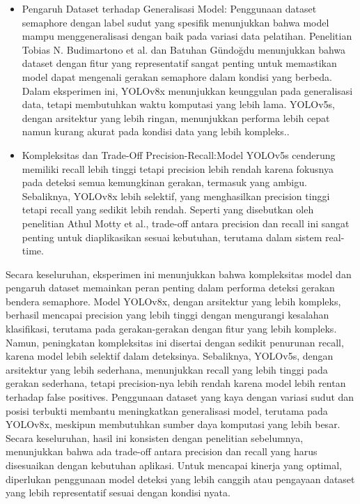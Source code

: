 \documentclass[12pt,a4paper]{article}
\begin{document}
\begin{adjustwidth}{3em}{0pt}
\begin{itemize}
    \item Pengaruh Dataset terhadap Generalisasi Model: Penggunaan dataset semaphore dengan label sudut yang spesifik menunjukkan bahwa model mampu menggeneralisasi dengan baik pada variasi data pelatihan. Penelitian Tobias N. Budimartono et al. dan Batuhan Gündoğdu menunjukkan bahwa dataset dengan fitur yang representatif sangat penting untuk memastikan model dapat mengenali gerakan semaphore dalam kondisi yang berbeda. Dalam eksperimen ini, YOLOv8x menunjukkan keunggulan pada generalisasi data, tetapi membutuhkan waktu komputasi yang lebih lama. YOLOv5s, dengan arsitektur yang lebih ringan, menunjukkan performa lebih cepat namun kurang akurat pada kondisi data yang lebih kompleks..

    \item Kompleksitas dan Trade-Off Precision-Recall:Model YOLOv5s cenderung memiliki recall lebih tinggi tetapi precision lebih rendah karena fokusnya pada deteksi semua kemungkinan gerakan, termasuk yang ambigu. Sebaliknya, YOLOv8x lebih selektif, yang menghasilkan precision tinggi tetapi recall yang sedikit lebih rendah. Seperti yang disebutkan oleh penelitian Athul Motty et al., trade-off antara precision dan recall ini sangat penting untuk diaplikasikan sesuai kebutuhan, terutama dalam sistem real-time. 
    \end{itemize}

\hspace{0.5cm} Secara keseluruhan, eksperimen ini menunjukkan bahwa kompleksitas model dan pengaruh dataset memainkan peran penting dalam performa deteksi gerakan bendera semaphore. Model YOLOv8x, dengan arsitektur yang lebih kompleks, berhasil mencapai precision yang lebih tinggi dengan mengurangi kesalahan klasifikasi, terutama pada gerakan-gerakan dengan fitur yang lebih kompleks. Namun, peningkatan kompleksitas ini disertai dengan sedikit penurunan recall, karena model lebih selektif dalam deteksinya. Sebaliknya, YOLOv5s, dengan arsitektur yang lebih sederhana, menunjukkan recall yang lebih tinggi pada gerakan sederhana, tetapi precision-nya lebih rendah karena model lebih rentan terhadap false positives. Penggunaan dataset yang kaya dengan variasi sudut dan posisi terbukti membantu meningkatkan generalisasi model, terutama pada YOLOv8x, meskipun membutuhkan sumber daya komputasi yang lebih besar. Secara keseluruhan, hasil ini konsisten dengan penelitian sebelumnya, menunjukkan bahwa ada trade-off antara precision dan recall yang harus disesuaikan dengan kebutuhan aplikasi. Untuk mencapai kinerja yang optimal, diperlukan penggunaan model deteksi yang lebih canggih atau pengayaan dataset yang lebih representatif sesuai dengan kondisi nyata.


\end{adjustwidth}
\end{document}
